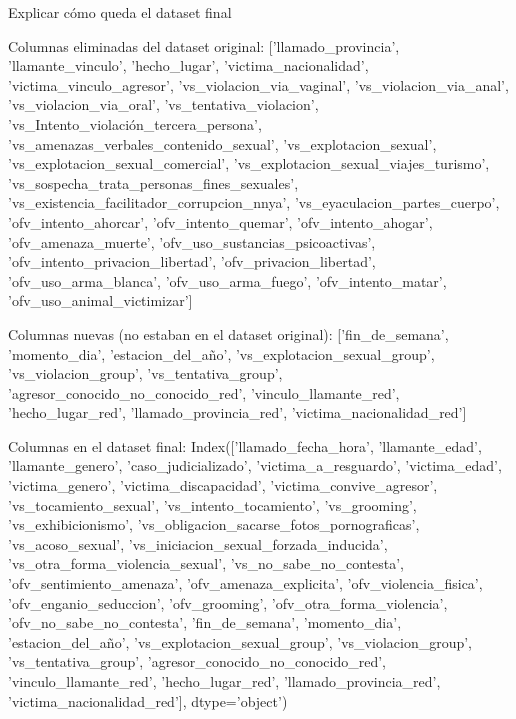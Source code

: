 \documentclass[10 pt]{article}
\begin{document}
Explicar cómo queda el dataset final

Columnas eliminadas del dataset original:  ['llamado\_provincia', 'llamante\_vinculo', 'hecho\_lugar', 'victima\_nacionalidad', 'victima\_vinculo\_agresor', 'vs\_violacion\_via\_vaginal', 'vs\_violacion\_via\_anal', 'vs\_violacion\_via\_oral', 'vs\_tentativa\_violacion', 'vs\_Intento\_violación\_tercera\_persona', 'vs\_amenazas\_verbales\_contenido\_sexual', 'vs\_explotacion\_sexual', 'vs\_explotacion\_sexual\_comercial', 'vs\_explotacion\_sexual\_viajes\_turismo', 'vs\_sospecha\_trata\_personas\_fines\_sexuales', 'vs\_existencia\_facilitador\_corrupcion\_nnya', 'vs\_eyaculacion\_partes\_cuerpo', 'ofv\_intento\_ahorcar', 'ofv\_intento\_quemar', 'ofv\_intento\_ahogar', 'ofv\_amenaza\_muerte', 'ofv\_uso\_sustancias\_psicoactivas', 'ofv\_intento\_privacion\_libertad', 'ofv\_privacion\_libertad', 'ofv\_uso\_arma\_blanca', 'ofv\_uso\_arma\_fuego', 'ofv\_intento\_matar', 'ofv\_uso\_animal\_victimizar']


Columnas nuevas (no estaban en el dataset original):  ['fin\_de\_semana', 'momento\_dia', 'estacion\_del\_año', 'vs\_explotacion\_sexual\_group', 'vs\_violacion\_group', 'vs\_tentativa\_group', 'agresor\_conocido\_no\_conocido\_red', 'vinculo\_llamante\_red', 'hecho\_lugar\_red', 'llamado\_provincia\_red', 'victima\_nacionalidad\_red']


Columnas en el dataset final:  Index(['llamado\_fecha\_hora', 'llamante\_edad', 'llamante\_genero',
       'caso\_judicializado', 'victima\_a\_resguardo', 'victima\_edad',
       'victima\_genero', 'victima\_discapacidad', 'victima\_convive\_agresor',
       'vs\_tocamiento\_sexual', 'vs\_intento\_tocamiento', 'vs\_grooming',
       'vs\_exhibicionismo', 'vs\_obligacion\_sacarse\_fotos\_pornograficas',
       'vs\_acoso\_sexual', 'vs\_iniciacion\_sexual\_forzada\_inducida',
       'vs\_otra\_forma\_violencia\_sexual', 'vs\_no\_sabe\_no\_contesta',
       'ofv\_sentimiento\_amenaza', 'ofv\_amenaza\_explicita',
       'ofv\_violencia\_fisica', 'ofv\_enganio\_seduccion', 'ofv\_grooming',
       'ofv\_otra\_forma\_violencia', 'ofv\_no\_sabe\_no\_contesta', 'fin\_de\_semana',
       'momento\_dia', 'estacion\_del\_año', 'vs\_explotacion\_sexual\_group',
       'vs\_violacion\_group', 'vs\_tentativa\_group',
       'agresor\_conocido\_no\_conocido\_red', 'vinculo\_llamante\_red',
       'hecho\_lugar\_red', 'llamado\_provincia\_red', 'victima\_nacionalidad\_red'],
      dtype='object')
\end{document}
